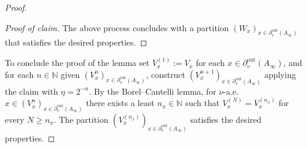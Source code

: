 \documentclass[10pt,a4paper]{amsart}
\renewcommand{\geq}{\geqslant}
\begin{document}
\begin{proof}
\begin{proof}[Proof of claim]
    The above process concludes with a partition $(W_x)_{x\in \partial_v^{\mathrm{out}} (A_\infty)}$ that satisfies the desired properties.

    
    \end{proof}

   To conclude the proof of the lemma set $V_x^{(1)} := V_x$ for each $x\in \partial_v^{\mathrm{out}} (A_\infty)$, and for each $n\in \mathbb N$ given $(V_x^{n})_{x \in \partial_v^{\mathrm{out}} (A_\infty)}$, construct $(V_x^{n+1})_{x \in \partial_v^{\mathrm{out}} (A_\infty)}$ applying the claim with $\eta = 2^{-n}$. By the Borel--Cantelli lemma, for $\nu$-a.e.\ $x\in (V_x^{n})_{x \in \partial_v^{\mathrm{out}} (A_\infty)}$ there exists a least $n_x \in \mathbb N$ such that $V_x^{(N)} = V_x^{(n_x)}$ for every $N \geq n_x$. The partition $(V_x^{(n_x)})_{x \in \partial_v^{\mathrm{out}} (A_\infty)}$ satisfies the desired properties.  
\end{proof}
\end{document}
